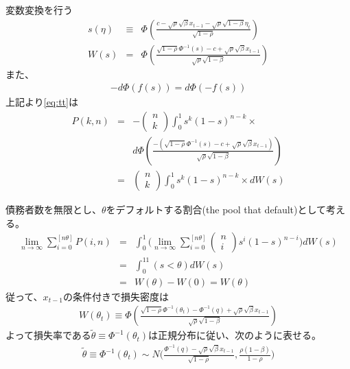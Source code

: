 \documentclass[dvipdfmx]{beamer}
\begin{document}
\begin{frame}
変数変換を行う
\begin{eqnarray}
s(\eta)
&\equiv&
\Phi(
\frac{c-\sqrt{\rho}\sqrt{\beta}x_{t-1}-\sqrt{\rho}\sqrt{1-\beta}\eta_t}{\sqrt{1-\rho}}
)\nonumber\\
W(s)&=&\Phi(
\frac{\sqrt{1-\rho}\Phi^{-1}(s)-c+\sqrt{\rho}\sqrt{\beta}x_{t-1}}{\sqrt{\rho}\sqrt{1-\beta}}
)\nonumber
\end{eqnarray}
また、
\begin{eqnarray}
-d\Phi(f(s))=d\Phi(-f(s))\nonumber
\end{eqnarray}
上記より\eqref{eq:tt}は
\begin{eqnarray}
P(k,n)&=&
-
\begin{pmatrix}
n\\
k
\end{pmatrix}
\int_{0}^{1}s^k(1-s)^{n-k}
\times\nonumber\\
&&d \Phi(
\frac{-(\sqrt{1-\rho}\Phi^{-1}(s)-c+\sqrt{\rho}\sqrt{\beta}x_{t-1})}
{\sqrt{\rho}\sqrt{1-\beta}}
)\nonumber\\
&=&
\begin{pmatrix}
n\\
k
\end{pmatrix}
\int_{0}^{1}s^k(1-s)^{n-k}
\times
dW(s)\nonumber
\end{eqnarray}
\end{frame}

\begin{frame}
債務者数を無限とし、$\theta$をデフォルトする割合(the pool that default)として考える。
\begin{eqnarray}
\lim_{n\rightarrow\infty}\sum_{i=0}^{[n\theta]}P(i,n)
&=&
\int_0^1\bigl(\lim_{n\rightarrow\infty}\sum_{i=0}^{[n\theta]}
\begin{pmatrix}
n\\
i
\end{pmatrix}
s^i(1-s)^{n-i}
\bigr)dW(s)\nonumber\\
&=&
\int_0^11(s<\theta)dW(s)\nonumber\\
&=&
W(\theta)-W(0)=W(\theta)\nonumber
\end{eqnarray}
従って、$x_{t-1}$の条件付きで損失密度は
\begin{eqnarray}
W(\theta_t)\equiv\Phi(\frac{\sqrt{1-\rho}\Phi^{-1}(\theta_t)-\Phi^{-1}(q)+\sqrt{\rho}\sqrt{\beta}x_{t-1}}{\sqrt{\rho}\sqrt{1-\beta}})\nonumber
\end{eqnarray}
よって損失率である$\tilde{\theta}\equiv\Phi^{-1}(\theta_t)$は正規分布に従い、次のように表せる。
\begin{eqnarray}
\tilde{\theta}\equiv\Phi^{-1}(\theta_t)\sim N\bigl(\frac{\Phi^{-1}(q)-\sqrt{\rho}\sqrt{\beta}x_{t-1}}{\sqrt{1-\rho}},
\frac{\rho(1-\beta)}{1-\rho}
\bigr)\nonumber
\end{eqnarray}
\end{frame}
\end{document}
